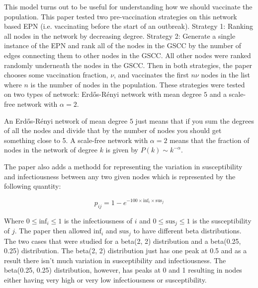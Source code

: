 This model turns out to be useful for understanding how we should vaccinate the population. This paper tested two pre-vaccination strategies on this network based EPN (i.e.
vaccinating before the start of an outbreak). Strategy 1:
Ranking all nodes in the network by decreasing degree. Strategy 2: Generate a single instance of the EPN and rank all of the nodes in the GSCC by the number of edges connecting
them to other nodes in the GSCC. All other nodes were ranked randomly underneath the nodes in the GSCC. Then in both strategies, the paper chooses some vaccination fraction, $\nu$,
and vaccinates the first $n\nu$ nodes in the list where $n$ is the number of nodes in the population. These strategies were tested on two types of network: Erd\H{o}s-R\'{e}nyi network
with mean degree $5$ and a scale-free network with $\alpha = 2$.

An Erd\H{o}s-R\'{e}nyi network of mean degree $5$ just means that if you sum the degrees of all the nodes and divide that by the number of nodes you should get something close to
5. A scale-free network with $\alpha = 2$ means that the fraction of nodes in the network of degree $k$ is given by $P(k) \sim k^{-\alpha}$.

The paper also adds a methodd for representing the variation in susceptibility and infectiousness between any two given nodes which is represented by the following quantity:

$$p_{ij} = 1 - e^{-100 \times \text{inf}_i \times \text{sus}_j}$$

Where $0 \le \text{inf}_i \le 1$ is the infectiousness of $i$ and $0 \le \text{sus}_j \le 1$ is the susceptibility of $j$. The paper then allowed $\text{inf}_i$ and $\text{sus}_j$
to have different beta distributions. The two cases that were studied for a beta(2, 2) distribution and a beta(0.25, 0.25) distribution. The beta(2, 2) distribution just has one
peak at 0.5 and as a result there isn't much variation in susceptibility and infectiousness. The beta(0.25, 0.25) distribution, however, has peaks at 0 and 1 resulting in nodes
either having very high or very low infectiousness or susceptibility.

